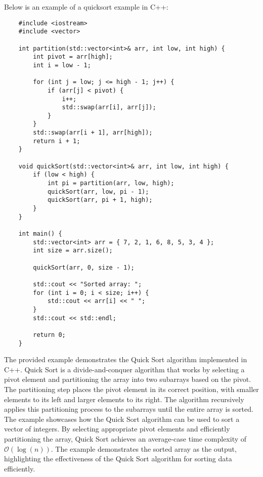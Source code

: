 \begin{solution}
    Below is an example of a quicksort example in C++:

    \horizontalline

    \begin{verbatim}
    #include <iostream>
    #include <vector>
    
    int partition(std::vector<int>& arr, int low, int high) {
        int pivot = arr[high];
        int i = low - 1;
    
        for (int j = low; j <= high - 1; j++) {
            if (arr[j] < pivot) {
                i++;
                std::swap(arr[i], arr[j]);
            }
        }
        std::swap(arr[i + 1], arr[high]);
        return i + 1;
    }
    
    void quickSort(std::vector<int>& arr, int low, int high) {
        if (low < high) {
            int pi = partition(arr, low, high);
            quickSort(arr, low, pi - 1);
            quickSort(arr, pi + 1, high);
        }
    }
    
    int main() {
        std::vector<int> arr = { 7, 2, 1, 6, 8, 5, 3, 4 };
        int size = arr.size();
    
        quickSort(arr, 0, size - 1);
    
        std::cout << "Sorted array: ";
        for (int i = 0; i < size; i++) {
            std::cout << arr[i] << " ";
        }
        std::cout << std::endl;
    
        return 0;
    }  
    \end{verbatim}

    \horizontalline

    The provided example demonstrates the Quick Sort algorithm implemented in C++. Quick Sort is a divide-and-conquer algorithm that works by selecting a pivot element and partitioning the array into two subarrays based on the pivot. The partitioning step places the pivot element in its correct position, with smaller elements to its left and 
    larger elements to its right. The algorithm recursively applies this partitioning process to the subarrays until the entire array is sorted. The example showcases how the Quick Sort algorithm can be used to sort a vector of integers. By selecting appropriate pivot elements and efficiently partitioning the array, Quick Sort achieves an 
    average-case time complexity of $\mathcal{O}(\log{(n)})$. The example demonstrates the sorted array as the output, highlighting the effectiveness of the Quick Sort algorithm for sorting data efficiently.
\end{solution}


